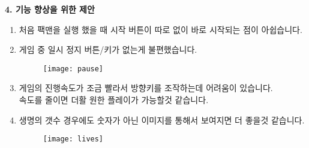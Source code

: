 \documentclass{article}
\begin{document}
\newpage
\begin{large}\textbf{4. 기능 향상을 위한 제안}\end{large}
\begin{enumerate}
\item 처음 팩맨을 실행 했을 때 시작 버튼이 따로 없이 바로 시작되는 점이 아쉽습니다.
\item 게임 중 일시 정지 버튼/키가 없는게 불편했습니다.

 \begin{figure}[!h]
\centering
\texttt{[image: pause]}
\end{figure}

\item 게임의 진행속도가 조금 빨라서 방향키를 조작하는데 어려움이 있습니다.\\ 속도를 줄이면 더활 원한 플레이가 가능할것 같습니다.
\item 생명의 갯수 경우에도 숫자가 아닌 이미지를 통해서 보여지면 더 좋을것 같습니다.
 \begin{figure}[!h]
\centering
\texttt{[image: lives]}
\end{figure}
\end{enumerate}
\end{document}
